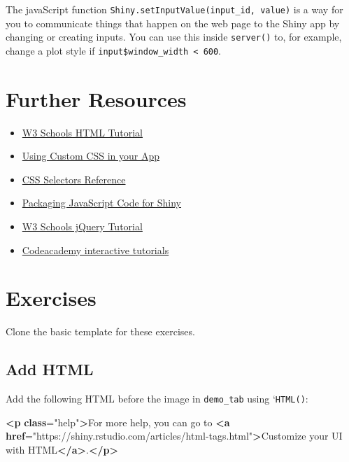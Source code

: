 \documentclass[
  oneside]{book}
\newenvironment{Shaded}{\begin{snugshade}}{\end{snugshade}}
\newcommand{\ErrorTok}[1]{\textcolor[rgb]{0.64,0.00,0.00}{\textbf{#1}}}
\newcommand{\KeywordTok}[1]{\textcolor[rgb]{0.13,0.29,0.53}{\textbf{#1}}}
\newcommand{\NormalTok}[1]{#1}
\newcommand{\OtherTok}[1]{\textcolor[rgb]{0.56,0.35,0.01}{#1}}
\newcommand{\StringTok}[1]{\textcolor[rgb]{0.31,0.60,0.02}{#1}}
\providecommand{\tightlist}{%
  \setlength{\itemsep}{0pt}\setlength{\parskip}{0pt}}
\begin{document}
The javaScript function \texttt{Shiny.setInputValue(input\_id,\ value)} is a way for you to communicate things that happen on the web page to the Shiny app by changing or creating inputs. You can use this inside \texttt{server}\texttt{()} to, for example, change a plot style if \texttt{input\$window\_width\ \textless{}\ 600}.

\hypertarget{resources-web}{%
\section{Further Resources}\label{resources-web}}

\begin{itemize}
\tightlist
\item
  \href{https://www.w3schools.com/html/}{W3 Schools HTML Tutorial}
\item
  \href{https://shiny.rstudio.com/articles/css.html}{Using Custom CSS in your App}
\item
  \href{https://www.w3schools.com/cssref/css_selectors.asp}{CSS Selectors Reference}
\item
  \href{https://shiny.rstudio.com/articles/packaging-javascript.html}{Packaging JavaScript Code for Shiny}
\item
  \href{https://www.w3schools.com/jquERy/default.asp}{W3 Schools jQuery Tutorial}
\item
  \href{https://www.codecademy.com/en/tracks/htmlcss}{Codeacademy interactive tutorials}
\end{itemize}

\hypertarget{exercises-web}{%
\section{Exercises}\label{exercises-web}}

Clone the basic template for these exercises.

\hypertarget{add-html}{%
\subsection{Add HTML}\label{add-html}}

Add the following HTML before the image in \texttt{demo\_tab} using `\texttt{HTML}\texttt{()}:

\begin{Shaded}
\begin{Highlighting}[]
\KeywordTok{\textless{}p} \ErrorTok{class}\OtherTok{=}\StringTok{"help"}\KeywordTok{\textgreater{}}\NormalTok{For more help, you can go to }\KeywordTok{\textless{}a} \ErrorTok{href}\OtherTok{=}\StringTok{"https://shiny.rstudio.com/articles/html{-}tags.html"}\KeywordTok{\textgreater{}}\NormalTok{Customize your UI with HTML}\KeywordTok{\textless{}/a\textgreater{}}\NormalTok{.}\KeywordTok{\textless{}/p\textgreater{}}
\end{Highlighting}
\end{Shaded}
\end{document}
